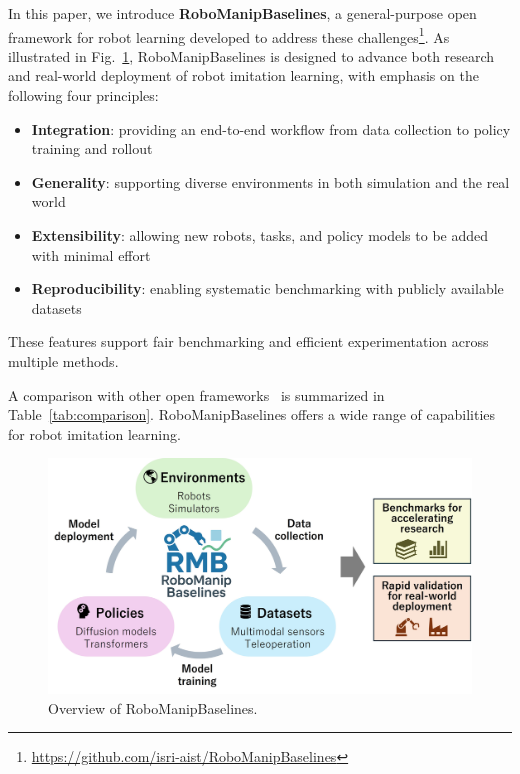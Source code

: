 \documentclass[letterpaper, 10 pt, conference]{ieeeconf}  %
\newcommand{\figref}[1]{{Fig.~\ref{#1}}}
\newcommand{\tabref}[1]{{Table~\ref{#1}}}
\begin{document}
In this paper, we introduce \textbf{RoboManipBaselines}, a general-purpose open framework for robot learning developed to address these challenges\footnote{\url{https://github.com/isri-aist/RoboManipBaselines}}.
As illustrated in \figref{fig:overview}, RoboManipBaselines is designed to advance both research and real-world deployment of robot imitation learning, with emphasis on the following four principles:
\begin{itemize}
\item \textbf{Integration}: providing an end-to-end workflow from data collection to policy training and rollout
\item \textbf{Generality}: supporting diverse environments in both simulation and the real world
\item \textbf{Extensibility}: allowing new robots, tasks, and policy models to be added with minimal effort
\item \textbf{Reproducibility}: enabling systematic benchmarking with publicly available datasets
\end{itemize}
These features support fair benchmarking and efficient experimentation across multiple methods.

A comparison with other open frameworks~\cite{Robomimic:Mandlekar:CoRL2021,LIBERO:Liu:NeurIPS2023,Maniskill:Tao:RSS2025,RoboHive:Kumar:NeurIPS2023,RoboCasa:Nasiriany:RSS2024,D3IL:Jia:ICLR2024,Colosseum:Pumacay:RSS2024,LeRobot:Cadene:GitHub2024,RoboVerse:Geng:RSS2025} is summarized in \tabref{tab:comparison}.
RoboManipBaselines offers a wide range of capabilities for robot imitation learning.

\begin{figure}[tb]
  \centering
  \includegraphics[width=0.99\columnwidth]{figs/overview2.jpg}
  \caption{Overview of RoboManipBaselines.}
  \label{fig:overview}
\end{figure}
\end{document}
